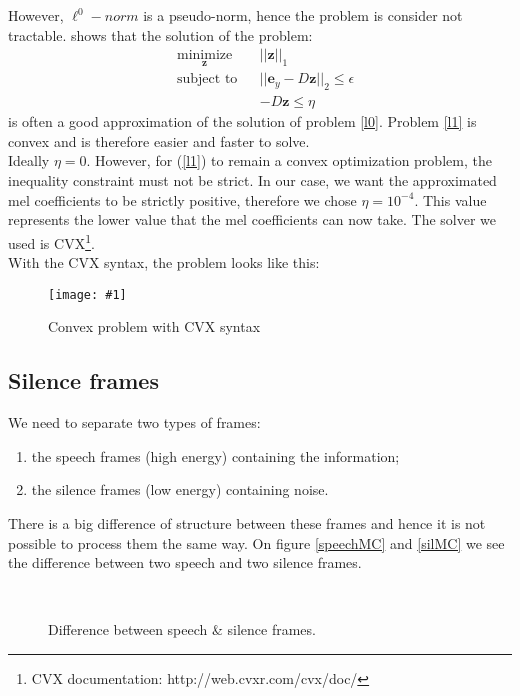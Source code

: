 \documentclass[a4paper]{report}
\newcommand{\img}[3]{\begin{figure}[!h] \centering \texttt{[image: \#1]}\captionsetup{justification=centering} \caption{#3} \label{#1} \end{figure}}
\newcommand{\ey}{\textbf{e}_y}
\newcommand{\exhat}{ \hat{\textbf{e}}_x }
\newcommand{\zhat}{ \hat{\textbf{z}} }
\begin{document}

However, $\ell^0-norm$ is a pseudo-norm, hence the problem is consider not tractable. \cite{equivalencel1l0} shows that the solution of the problem:
\begin{equation}
  \begin{aligned}
    & \underset{\mathbf{z}}{\text{minimize}}
    & & ||\mathbf{z}||_1 \\
    & \text{subject to}
    & & ||\ey -D\mathbf{z}||_2 \leq \epsilon\\
    &&& -D\mathbf{z} \leq \eta
  \end{aligned}
\label{l1}
\end{equation}
 is often a good approximation of the solution of problem \ref{l0}. Problem \ref{l1} is convex and is therefore easier and faster to solve.\\
Ideally $\eta = 0$. However, for (\ref{l1}) to remain a convex optimization problem, the inequality constraint must not be strict. In our case, we want the approximated mel coefficients to be strictly positive, therefore we chose $\eta = 10^{-4}$. This value represents the lower value that the mel coefficients can now take.
The solver we used is CVX\footnote{CVX documentation: http://web.cvxr.com/cvx/doc/}.\\

With the CVX syntax, the problem looks like this:
\img{convex_problem}{.7}{Convex problem with CVX syntax}


\subsection{Silence frames}
We need to separate two types of frames:\begin{enumerate}
\item the speech frames (high energy) containing the information;
\item the silence frames (low energy) containing  noise. \end{enumerate}

There is a big difference of structure between these frames and hence it is not possible to process them the same way.
On figure \ref{speechMC} and \ref{silMC} we see the difference  between two speech and two silence frames.

\begin{figure}[!ht]
\subfloat[Mel coefficients of a silence frame. Here we did not process the silence so $\exhat=\ey$]{\texttt{[image: silenceframeMC]}\label{silMC}}\\
\caption{Difference between speech \& silence frames.}
\end{figure}
\end{document}

